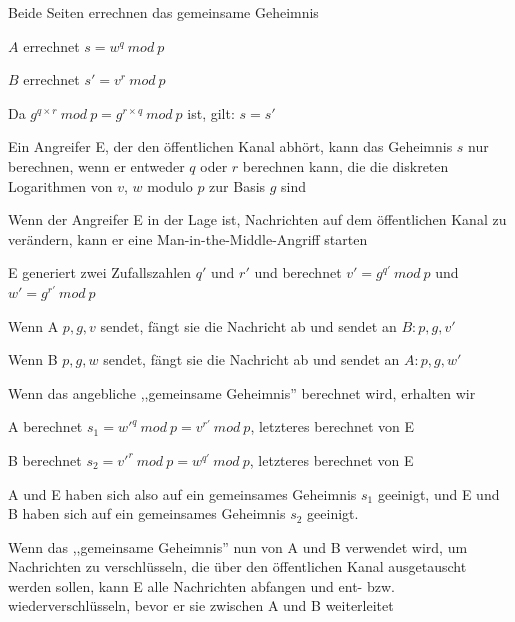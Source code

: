\documentclass[a4paper]{article}
\begin{document}
\begin{multicols}{3}
\begin{itemize*}
\begin{itemize*}
                  \item Beide Seiten errechnen das gemeinsame Geheimnis
                  \begin{itemize*}
                        \item $A$ errechnet $s=w^q\ mod\ p$
                        \item $B$ errechnet $s'=v^r\ mod\ p$
                        \item Da $g^{q\times r}\ mod\ p = g^{r \times q}\ mod\ p$ ist, gilt: $s=s'$
                  \end{itemize*}
                  \item Ein Angreifer E, der den öffentlichen Kanal abhört, kann das Geheimnis $s$ nur berechnen, wenn er entweder $q$ oder $r$ berechnen kann, die die diskreten Logarithmen von $v$, $w$ modulo $p$ zur Basis $g$ sind
            \end{itemize*}
            \item Wenn der Angreifer E in der Lage ist, Nachrichten auf dem öffentlichen Kanal zu verändern, kann er eine Man-in-the-Middle-Angriff starten
            \begin{itemize*}
                  \item E generiert zwei Zufallszahlen $q'$ und $r'$ und berechnet $v'=g^{q'}\ mod\ p$ und $w'=g^{r'}\ mod\ p$
                  \item Wenn A ${p,g,v}$ sendet, fängt sie die Nachricht ab und sendet an $B:{p,g,v'}$
                  \item Wenn B ${p,g,w}$ sendet, fängt sie die Nachricht ab und sendet an $A:{p,g,w'}$
                  \item Wenn das angebliche ,,gemeinsame Geheimnis'' berechnet wird, erhalten wir
                  \begin{itemize*}
                        \item A berechnet $s_1=w'^q\ mod\ p = v^{r'}\ mod\ p$, letzteres berechnet von E
                        \item B berechnet $s_2=v'^r\ mod\ p = w^{q'}\ mod\ p$, letzteres berechnet von E
                        \item A und E haben sich also auf ein gemeinsames Geheimnis $s_1$ geeinigt, und E und B haben sich auf ein gemeinsames Geheimnis $s_2$ geeinigt.
                  \end{itemize*}
                  \item Wenn das ,,gemeinsame Geheimnis'' nun von A und B verwendet wird, um Nachrichten zu verschlüsseln, die über den öffentlichen Kanal ausgetauscht werden sollen, kann E alle Nachrichten abfangen und ent- bzw. wiederverschlüsseln, bevor er sie zwischen A und B weiterleitet

\end{itemize*}
\end{itemize*}
\end{multicols}
\end{document}
